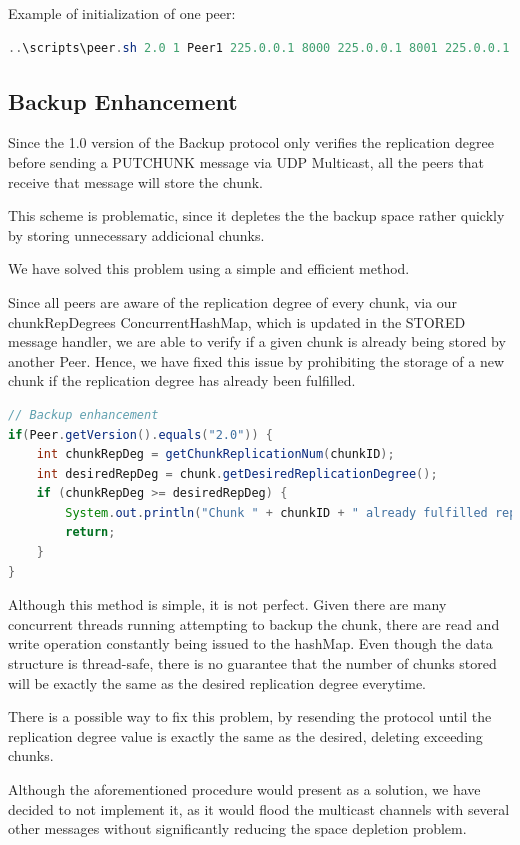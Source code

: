 \documentclass[11pt]{article}
\begin{document}
Example of initialization of one peer:
\begin{lstlisting}[language=java]
..\scripts\peer.sh 2.0 1 Peer1 225.0.0.1 8000 225.0.0.1 8001 225.0.0.1 8002
\end{lstlisting}

\bigskip
\pagebreak
\subsection{Backup Enhancement}
Since the 1.0 version of the Backup protocol only verifies the replication degree before sending a PUTCHUNK message via UDP Multicast, all the peers that receive that message will store the chunk.

This scheme is problematic, since it depletes the the backup space rather quickly by storing unnecessary addicional chunks.

We have solved this problem using a simple and efficient method.

Since all peers are aware of the replication degree of every chunk, via our chunkRepDegrees ConcurrentHashMap, which is updated in the STORED message handler, we are able to verify if a given chunk is already being stored
by another Peer. Hence, we have fixed this issue by prohibiting the storage of a new chunk if the replication degree has already been fulfilled.

\begin{lstlisting}[language=java]
// Backup enhancement
if(Peer.getVersion().equals("2.0")) {
	int chunkRepDeg = getChunkReplicationNum(chunkID);
	int desiredRepDeg = chunk.getDesiredReplicationDegree();
	if (chunkRepDeg >= desiredRepDeg) {
		System.out.println("Chunk " + chunkID + " already fulfilled repDegree. Ignoring chunk...");
		return;
	}
}
\end{lstlisting}

Although this method is simple, it is not perfect.
Given there are many concurrent threads running attempting to backup the chunk, there are read and write operation constantly being issued to the hashMap.
Even though the data structure is thread-safe, there is no guarantee that the number of chunks stored will be exactly the same as the desired replication degree everytime.

There is a possible way to fix this problem, by resending the protocol until the replication degree value is exactly the same as the desired, deleting exceeding chunks.

Although the aforementioned procedure would present as a solution, we have decided to not implement it, 
as it would flood the multicast channels with several other messages without significantly reducing the space depletion problem.
\end{document}
